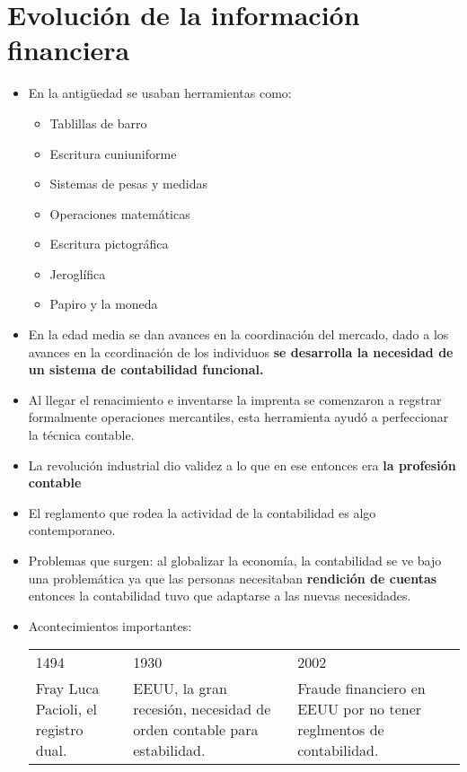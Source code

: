 \documentclass{article}
\begin{document}
\section{Evolución de la información financiera}
\begin{itemize}
    \item En la antigüedad se usaban herramientas como:
    \begin{itemize}
        \item Tablillas de barro 
        \item Escritura cuniuniforme 
        \item Sistemas de pesas y medidas 
        \item Operaciones matemáticas
        \item Escritura pictográfica
        \item Jeroglífica
        \item Papiro y la moneda
    \end{itemize}
    
    \item En la edad media se dan avances en la coordinación del mercado, dado a los avances en la ccordinación de los individuos \textbf{se desarrolla la necesidad de un sistema de contabilidad funcional.}

    \item Al llegar el renacimiento e inventarse la imprenta se comenzaron a regstrar formalmente operaciones mercantiles, esta herramienta ayudó a perfeccionar la técnica contable.
    \item La revolución industrial dio validez a lo que en ese entonces era \textbf{la profesión contable}
    \item El reglamento que rodea la actividad de la contabilidad es algo contemporaneo. 

    
    \item Problemas que surgen: al globalizar la economía, la contabilidad se ve bajo una problemática ya que las personas necesitaban \textbf{rendición de cuentas} entonces la contabilidad tuvo que adaptarse a las nuevas necesidades.

    \item   Acontecimientos importantes:

        \begin{center}
        \begin{tabular}{ | p{5cm} | p{5cm} | p{5cm} | } 
         \hline
        1494 & 1930 & 2002 \\
        Fray Luca Pacioli, el registro dual. & EEUU, la gran recesión, necesidad de orden contable para estabilidad. & Fraude financiero en EEUU por no tener reglmentos de contabilidad. \\ 
         \hline
        \end{tabular}
        \end{center}


\end{itemize}
\end{document}

